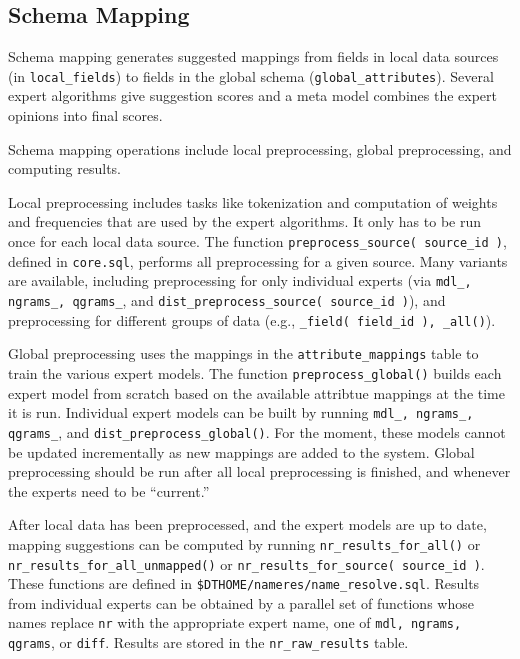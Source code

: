 \subsection{Schema Mapping}

Schema mapping generates suggested mappings from fields in local data sources (in \texttt{local\_fields}) to fields in the global schema (\texttt{global\_attributes}).  Several expert algorithms give suggestion scores and a meta model combines the expert opinions into final scores.

Schema mapping operations include local preprocessing, global preprocessing, and computing results.

Local preprocessing includes tasks like tokenization and computation of weights and frequencies that are used by the expert algorithms.  It only has to be run once for each local data source.  The function \texttt{preprocess\_source( source\_id )}, defined in \texttt{core.sql}, performs all preprocessing for a given source.  Many variants are available, including preprocessing for only individual experts (via \texttt{mdl\_, ngrams\_, qgrams\_}, and \texttt{dist\_preprocess\_source( source\_id )}), and preprocessing for different groups of data (e.g., \texttt{\_field( field\_id ), \_all()}).

Global preprocessing uses the mappings in the \texttt{attribute\_mappings} table to train the various expert models.  The function \texttt{preprocess\_global()} builds each expert model from scratch based on the available attribtue mappings at the time it is run.  Individual expert models can be built by running \texttt{mdl\_, ngrams\_, qgrams\_}, and \texttt{dist\_preprocess\_global()}.  For the moment, these models cannot be updated incrementally as new mappings are added to the system.  Global preprocessing should be run after all local preprocessing is finished, and whenever the experts need to be ``current.''

After local data has been preprocessed, and the expert models are up to date, mapping suggestions can be computed by running \texttt{nr\_results\_for\_all()} or \texttt{nr\_results\_for\_all\_unmapped()} or \texttt{nr\_results\_for\_source( source\_id )}.  These functions are defined in \texttt{\$DTHOME/nameres/name\_resolve.sql}.  Results from individual experts can be obtained by a parallel set of functions whose names replace \texttt{nr} with the appropriate expert name, one of \texttt{mdl, ngrams, qgrams}, or \texttt{diff}.  Results are stored in the \texttt{nr\_raw\_results} table. 

